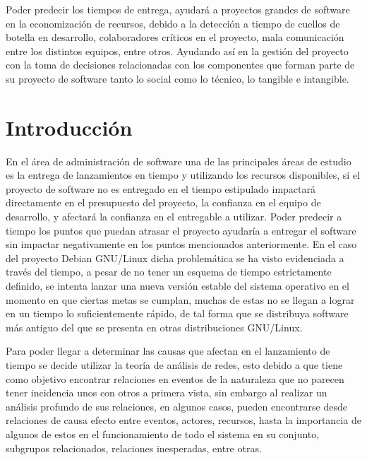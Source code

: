 \documentclass[12pt]{report}
\begin{document}
Poder predecir los tiempos de entrega, ayudará a proyectos grandes de
software en la economización de recursos, debido a la detección a
tiempo de cuellos de botella en desarrollo, colaboradores críticos en
el proyecto, mala comunicación entre los distintos equipos, entre
otros. Ayudando así en la gestión del proyecto con la toma de
decisiones relacionadas con los componentes que forman parte de su
proyecto de software tanto lo social como lo técnico, lo tangible e
intangible.

\chapter*{Introducción} En  el área de administración  de software una
de las principales  áreas de estudio es la entrega  de lanzamientos en
tiempo  y  utilizando los  recursos  disponibles,  si el  proyecto  de
software   no  es   entregado  en   el  tiempo   estipulado  impactará
directamente en el presupuesto del proyecto, la confianza en el equipo
de  desarrollo,   y  afectará   la  confianza   en  el   entregable  a
utilizar. Poder  predecir a  tiempo los puntos  que puedan  atrasar el
proyecto ayudaría a entregar el software sin impactar negativamente en
los puntos mencionados  anteriormente. En el caso  del proyecto Debian
GNU/Linux  dicha problemática  se ha  visto evidenciada  a través  del
tiempo,  a  pesar de  no  tener  un  esquema de  tiempo  estrictamente
definido,  se intenta  lanzar una  nueva versión  estable del  sistema
operativo en  el momento en  que ciertas  metas se cumplan,  muchas de
estas no se llegan a lograr en un tiempo lo suficientemente rápido, de
tal forma que  se distribuya software más antiguo del  que se presenta
en otras distribuciones GNU/Linux.

Para  poder  llegar  a  determinar   las  causas  que  afectan  en  el
lanzamiento  de tiempo  se decide  utilizar la  teoría de  análisis de
redes, esto debido  a que tiene como objetivo  encontrar relaciones en
eventos  de la  naturaleza que  no parecen  tener incidencia  unos con
otros a primera vista, sin embargo al realizar un análisis profundo de
sus relaciones, en algunos  casos, pueden encontrarse desde relaciones
de causa efecto entre eventos, actores, recursos, hasta la importancia
de algunos  de estos  en el  funcionamiento de todo  el sistema  en su
conjunto, subgrupos relacionados, relaciones inesperadas, entre otras.
\end{document}
